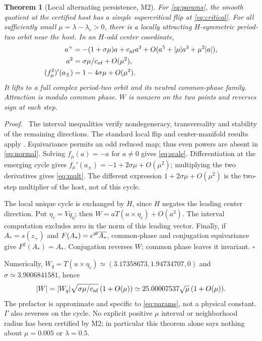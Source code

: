 \documentclass[11pt,a4paper]{article}
\newtheorem{theorem}{Theorem}\newtheorem{proposition}[theorem]{Proposition}\newtheorem{lemma}[theorem]{Lemma}
\newenvironment{proof}{\par\textit{Proof.}\ }{\hfill$\square$\par}
\begin{document}
\begin{theorem}[Local alternating persistence, M2]\label{thm:M2}
For \eqref{eq:params}, the smooth quotient at the certified host has a simple supercritical flip at \eqref{eq:critical}. For all sufficiently small $\mu=\lambda-\lambda_c>0$, there is a locally attracting $H$-symmetric period-two orbit near the host. In an $H$-odd center coordinate,
\begin{align}
 a^+&=-(1+\sigma\mu)a+c_{\rm nf}a^3
       +O(a^5+|\mu|a^3+\mu^2|a|),\label{eq:normal}\\
 a^2&=\sigma\mu/c_{\rm nf}+O(\mu^2),\label{eq:scale}\\
 (f_\mu^2)'(a_\pm)&=1-4\sigma\mu+O(\mu^2).\label{eq:mult}
\end{align}
It lifts to a full complex period-two orbit and its neutral common-phase family. Attraction is modulo common phase. $W$ is nonzero on the two points and reverses sign at each step.
\end{theorem}
\begin{proof}
The interval inequalities verify nondegeneracy, transversality and stability of the remaining directions. The standard local flip and center-manifold results apply \cite{Kuznetsov}. Equivariance permits an odd reduced map; thus even powers are absent in \eqref{eq:normal}. Solving $f_\mu(a)=-a$ for $a\ne0$ gives \eqref{eq:scale}. Differentiation at the emerging cycle gives $f_\mu'(a_\pm)=-1+2\sigma\mu+O(\mu^2)$; multiplying the two derivatives gives \eqref{eq:mult}. The different expression $1+2\sigma\mu+O(\mu^2)$ is the two-step multiplier of the host, not of this cycle.

The local unique cycle is exchanged by $H$, since $H$ negates the leading center direction. Put $\eta_c=Vq_{\eta}$; then $W=aT(u\times\eta_c)+O(a^3)$. The interval computation excludes zero in the norm of this leading vector. Finally, if $A_*=s(z_+)$ and $F(A_*)=e^{\mathrm i\theta}\overline{A_*}$, common-phase and conjugation equivariance give $F^2(A_*)=A_*$. Conjugation reverses $W$; common phase leaves it invariant.
\end{proof}
Numerically, $W_q=T(u\times\eta_c)\simeq(3.17358673,1.94734707,0)$ and $\sigma\simeq3.9006841581$, hence
\begin{equation}
 |W|=|W_q|\sqrt{\sigma\mu/c_{\rm nf}}\,(1+O(\mu))
 \simeq25.00007537\sqrt\mu\,(1+O(\mu)).\label{eq:Wscale}
\end{equation}
The prefactor is approximate and specific to \eqref{eq:params}, not a physical constant. $\Gamma$ also reverses on the cycle. No explicit positive $\mu$ interval or neighborhood radius has been certified by M2; in particular this theorem alone says nothing about $\mu=0.005$ or $\lambda=0.5$.
\end{document}
